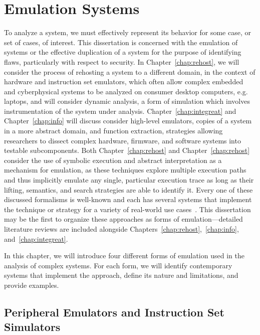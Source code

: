 \chapter{Emulation Systems}
\label{chap:emulation}

To analyze a system, we must effectively represent its behavior for some case, or set of cases, of interest.
This dissertation is concerned with the emulation of systems or the effective duplication of a system for the purpose of identifying flaws, particularly with respect to security.
In Chapter~\ref{chap:rehost}, we will consider the process of rehosting a system to a different domain, in the context of hardware and instruction set emulators, which often allow complex embedded and cyberphysical systems to be analyzed on consumer desktop computers, e.g. laptops, and will consider dynamic analysis, a form of simulation which involves instrumentation of the system under analysis.
Chapter~\ref{chap:integreat} and Chapter~\ref{chap:info} will discuss consider high-level emulators, copies of a system in a more abstract domain, and function extraction, strategies allowing researchers to dissect complex hardware, firmware, and software systems into testable subcomponents.
Both Chapter~\ref{chap:rehost} and Chapter~\ref{chap:rehost} consider the use of symbolic execution and abstract interpretation as a mechanism for emulation, as these techniques explore multiple execution paths and thus implicitly emulate any single, particular execution trace as long as their lifting, semantics, and search strategies are able to identify it.
Every one of these discussed formalisms is well-known and each has several systems that implement the technique or strategy for a variety of real-world use cases~\cite{bellard2005qemu, quynh2015unicorn, deng2013bistro, caballero2009binary, sen2013jalangi, zaddach2014avatar, wang2017angr, cadar2008klee}.
This dissertation may be the first to organize these approaches as forms of emulation---detailed literature reviews are included alongside Chapters~\ref{chap:rehost},\ \ref{chap:info}, and~\ref{chap:integreat}.

In this chapter, we will introduce four different forms of emulation used in the analysis of complex systems.
For each form, we will identify contemporary systems that implement the approach, define its nature and limitations, and provide examples.

\section{Peripheral Emulators and Instruction Set Simulators}
\label{sec:hardemu}

